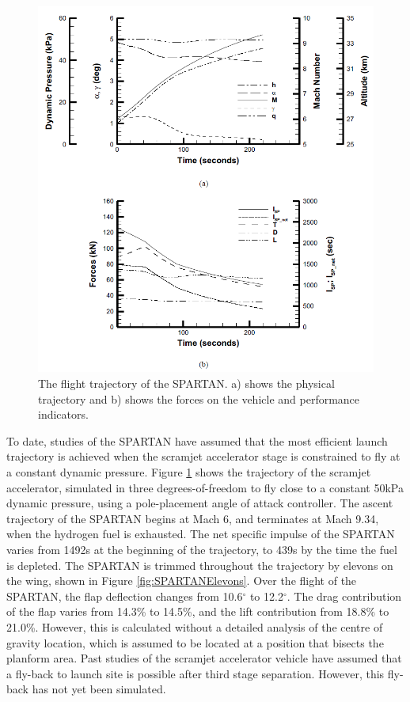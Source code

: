    \begin{figure}[!ht]
   	\centering
   	\includegraphics[width=0.9\linewidth]{figures/2_literature-review/SPARTAN_traj1}
   	\caption{The flight trajectory of the SPARTAN. a) shows the physical trajectory and b) shows the forces on the vehicle and performance indicators.}
   	\label{fig:SPARTAN_traj}
   \end{figure}
  
   To date, studies of the SPARTAN have assumed that the most efficient launch trajectory is achieved when the scramjet accelerator stage is constrained to fly at a constant dynamic pressure\cite{Preller2017b,Preller2018a}.
  Figure \ref{fig:SPARTAN_traj} shows the trajectory of the scramjet accelerator, simulated in three degrees-of-freedom to fly close to a constant 50kPa dynamic pressure, using a pole-placement angle of attack controller\cite{Preller2017b}.
  The ascent trajectory of the SPARTAN begins at Mach 6, and terminates at Mach 9.34, when the hydrogen fuel is exhausted\cite{Preller2018a}. 
  The net specific impulse of the SPARTAN varies from 1492s at the beginning of the trajectory, to 439s by the time the fuel is depleted\cite{Preller2017b}. 
  The SPARTAN is trimmed throughout the trajectory by elevons on the wing, shown in Figure \ref{fig:SPARTANElevons}. Over the flight of the SPARTAN, the flap deflection changes from 10.6$^\circ$ to 12.2$^\circ$\cite{Preller2018a}. The drag contribution of the flap varies from 14.3\% to 14.5\%, and the lift contribution from 18.8\% to 21.0\%\cite{Preller2018a}. However, this is calculated without a detailed analysis of the centre of gravity location, which is assumed to be located at a position that bisects the planform area. 
  Past studies of the scramjet accelerator vehicle have assumed that a fly-back to launch site is possible after third stage separation\cite{Preller2017b,Preller2018a}. However, this fly-back has not yet been simulated. 
  
